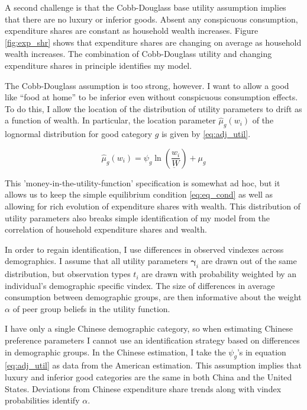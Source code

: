 A second challenge is that the Cobb-Douglass base utility assumption implies that there are no luxury or inferior goods.  Absent any conspicuous consumption, expenditure shares are constant as household  wealth increases.  Figure \ref{fig:exp_shr} shows that expenditure shares are changing on average as household wealth increases.  The combination of Cobb-Douglass utility and changing expenditure shares in principle identifies my model.

The Cobb-Douglass assumption is too strong, however.  I want to allow a good like ``food at home'' to be inferior even without conspicuous consumption effects.  To do this, I allow the location of the distribution of utility parameters to drift as a function of wealth.  In particular, the location parameter $\hat{\mu}_g(w_i)$ of the lognormal distribution for good category $g$ is given by \eqref{eq:adj_util}.

\begin{equation}
    \label{eq:adj_util}
    \hat{\mu}_g(w_i) = \psi_g \ln \left(\frac{w_i}{\underbar{W}}\right) + \mu_g
\end{equation}

This 'money-in-the-utility-function' specification is somewhat ad hoc, but it allows us to keep the simple equilibrium condition \eqref{eq:eq_cond} as well as allowing for rich evolution of expenditure shares with wealth.  This distribution of utility parameters also breaks simple identification of my model from the correlation of household expenditure shares and wealth.

In order to regain identification, I use differences in observed vindexes across demographics.  I assume that all utility parameters $\boldsymbol{\gamma}_i$ are drawn out of the same distribution, but observation types $t_i$ are drawn with probability weighted by an individual's demographic specific vindex.  The size of differences in average consumption between demographic groups, are then informative about the weight $\alpha$ of peer group beliefs in the utility function.

I have only a single Chinese demographic category, so when estimating Chinese preference parameters I cannot use an identification strategy based on differences in demographic groups.  In the Chinese estimation, I take the $\psi_g$'s in equation \eqref{eq:adj_util} as data from the American estimation.  This assumption implies that luxury and inferior good categories are the same in both China and the United States.  Deviations from Chinese expenditure share trends along with vindex probabilities identify $\alpha$.

